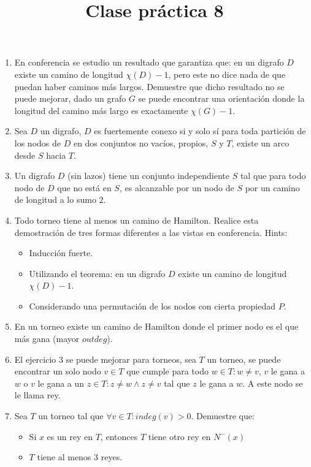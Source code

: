 \documentclass{article}
\begin{document}
\title{Clase pr\'actica 8}
\maketitle

\begin{enumerate}
    \item En conferencia se estudio un resultado que garantiza que: en un digrafo $D$ existe un camino de longitud $\chi(D) - 1$, pero este no dice nada de que puedan haber caminos más largos. Demuestre que dicho resultado no se puede mejorar, dado un grafo $G$ se puede encontrar una orientación donde la longitud del camino más largo es exactamente $\chi(G) - 1$.
    \item Sea $D$ un digrafo, $D$ es fuertemente conexo si y solo sí para toda partición de los nodos de $D$ en dos conjuntos no vacíos, propios, $S$ y $T$, existe un arco desde $S$ hacia $T$.
    \item Un digrafo $D$ (sin lazos) tiene un conjunto independiente $S$ tal que para todo nodo de $D$ que no está en $S$, es alcanzable por un nodo de $S$ por un camino de longitud a lo sumo $2$.
    \item Todo torneo tiene al menos un camino de Hamilton. Realice esta demostración de tres formas diferentes a las vistas en conferencia. Hints:
    \begin{itemize}
        \item Inducción fuerte.
        \item Utilizando el teorema: en un digrafo $D$ existe un camino de longitud $\chi(D) - 1$.
        \item Considerando una permutación de los nodos con cierta propiedad $P$.
    \end{itemize}
    \item En un torneo existe un camino de Hamilton donde el primer nodo es el que más gana (mayor $outdeg$).
    \item El ejercicio 3 se puede mejorar para torneos, sea $T$ un torneo, se puede encontrar un solo nodo $v \in T$ que cumple para todo $w \in T: w \neq v$, $v$ le gana a $w$ o $v$ le gana a un $z \in T: z \neq w \land z \neq v$ tal que $z$ le gana a $w$. A este nodo se le llama rey.
    \item Sea $T$ un torneo tal que $\forall v \in T: indeg(v) > 0$. Demuestre que:
    \begin{itemize}
        \item Si $x$ es un rey en $T$, entonces $T$ tiene otro rey en $N^-(x)$
        \item $T$ tiene al menos $3$ reyes.
    \end{itemize}
\end{enumerate}
\end{document}
